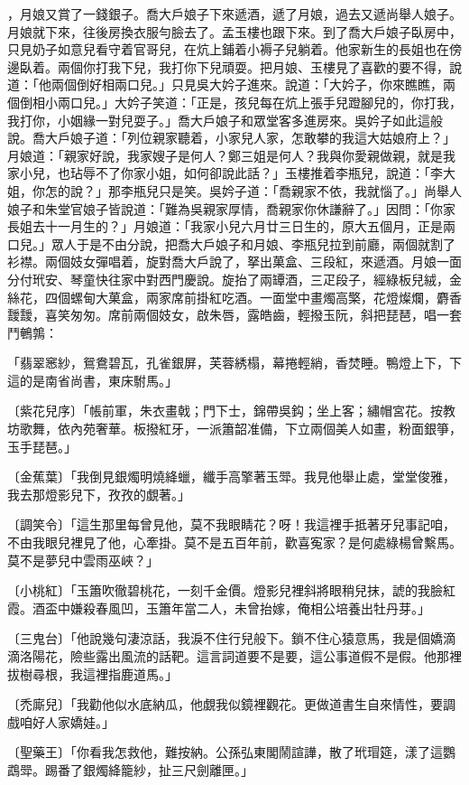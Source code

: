 \begin{showcontents}{}
，月娘又賞了一錢銀子。喬大戶娘子下來遞酒，遞了月娘，過去又遞尚舉人娘子。月娘就下來，往後房換衣服勻臉去了。孟玉樓也跟下來。到了喬大戶娘子臥房中，只見奶子如意兒看守着官哥兒，在炕上鋪着小褥子兒躺着。他家新生的長姐也在傍邊臥着。兩個你打我下兒，我打你下兒頑耍。把月娘、玉樓見了喜歡的要不得，說道：「他兩個倒好相兩口兒。」只見吳大妗子進來。說道：「大妗子，你來瞧瞧，兩個倒相小兩口兒。」大妗子笑道：「正是，孩兒每在炕上張手兒蹬腳兒的，你打我，我打你，小姻緣一對兒耍子。」喬大戶娘子和眾堂客多進房來。吳妗子如此這般說。喬大戶娘子道：「列位親家聽着，小家兒人家，怎敢攀的我這大姑娘府上？」月娘道：「親家好說，我家嫂子是何人？鄭三姐是何人？我與你愛親做親，就是我家小兒，也玷辱不了你家小姐，如何卻說此話？」玉樓推着李瓶兒，說道：「李大姐，你怎的說？」那李瓶兒只是笑。吳妗子道：「喬親家不依，我就惱了。」尚舉人娘子和朱堂官娘子皆說道：「難為吳親家厚情，喬親家你休謙辭了。」因問：「你家長姐去十一月生的？」月娘道：「我家小兒六月廿三日生的，原大五個月，正是兩口兒。」眾人于是不由分說，把喬大戶娘子和月娘、李瓶兒拉到前廳，兩個就割了衫襟。兩個妓女彈唱着，旋對喬大戶說了，拏出菓盒、三段紅，來遞酒。月娘一面分付玳安、琴童快往家中對西門慶說。旋抬了兩罈酒，三疋段子，經綠板兒絨，金絲花，四個螺甸大菓盒，兩家席前掛紅吃酒。一面堂中畫燭高檠，花燈燦爛，麝香靉靉，喜笑匆匆。席前兩個妓女，啟朱唇，露皓齒，輕撥玉阮，斜把琵琶，唱一套鬥鵪鶉：

「翡翠窸紗，鴛鴦碧瓦，孔雀銀屏，芙蓉綉榻，幕捲輕綃，香焚睡。鴨燈上下，下這的是南省尚書，東床駙馬。」

〔紫花兒序〕「帳前軍，朱衣畫戟；門下士，錦帶吳鈎；坐上客；繡帽宮花。按教坊歌舞，依內苑奢華。板撥紅牙，一派簫韶准備，下立兩個美人如畫，粉面銀箏，玉手琵琶。」

〔金蕉葉〕「我倒見銀燭明燒絳蠟，纖手高擎著玉斝。我見他舉止處，堂堂俊雅，我去那燈影兒下，孜孜的覷著。」

〔調笑令〕「這生那里每曾見他，莫不我眼睛花？呀！我這裡手抵著牙兒事記咱，不由我眼兒裡見了他，心牽掛。莫不是五百年前，歡喜寃家？是何處綠楊曾繫馬。莫不是夢兒中雲雨巫峽？」

〔小桃紅〕「玉簫吹徹碧桃花，一刻千金價。燈影兒裡斜將眼稍兒抹，諕的我臉紅霞。酒盃中嫌殺春風凹，玉簫年當二人，未曾抬嫁，俺相公培養出牡丹芽。」

〔三鬼台〕「他說幾句淒涼話，我淚不住行兒般下。鎖不住心猿意馬，我是個嬌滴滴洛陽花，險些露出風流的話靶。這言詞道要不是要，這公事道假不是假。他那裡拔樹尋根，我這裡指鹿道馬。」

〔禿廝兒〕「我勸他似水底納瓜，他覷我似鏡裡觀花。更做道書生自來情性，要調戲咱好人家嬌娃。」

〔聖藥王〕「你看我怎救他，難按納。公孫弘東閣鬧諠譁，散了玳瑁筵，漾了這鸚鵡斝。踢番了銀燭絳籠紗，扯三尺劍離匣。」


\end{showcontents}
